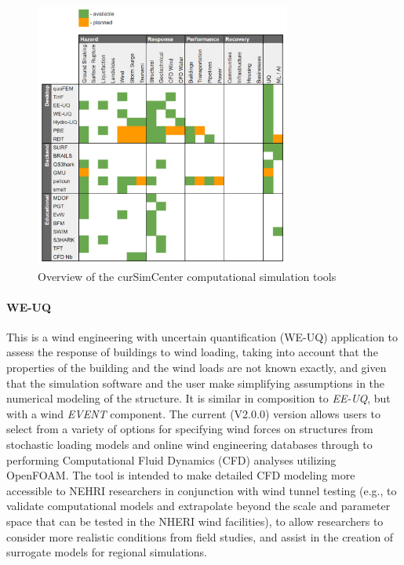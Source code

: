 \begin{figure}[htb]
    \centering
    \includegraphics[width=0.75\textwidth, angle = 0]{Figures/tool_overview.png}
    \caption{Overview of the curSimCenter computational simulation tools}
    \label{fig:intro_tool_overview}
\end{figure}

\paragraph{WE-UQ} This is a wind engineering with uncertain quantification (WE-UQ) application to assess the response of buildings to wind loading, taking into account that the properties of the building and the wind loads are not known exactly, and given that the simulation software and the user make simplifying assumptions in the numerical modeling of the structure. It is similar in composition to \emph{EE-UQ}, but with a wind \emph{EVENT} component.  The current (V2.0.0) version allows users to select from a variety of options for specifying wind forces on structures from stochastic loading models and online wind engineering databases through to performing Computational Fluid Dynamics (CFD) analyses utilizing OpenFOAM. The tool is intended to make detailed CFD modeling more accessible to NEHRI researchers in conjunction with wind tunnel testing (e.g., to validate computational models and extrapolate beyond the scale and parameter space that can be tested in the NHERI wind facilities), to allow researchers to consider more realistic conditions from field studies, and assist in the creation of surrogate models for regional simulations. 

